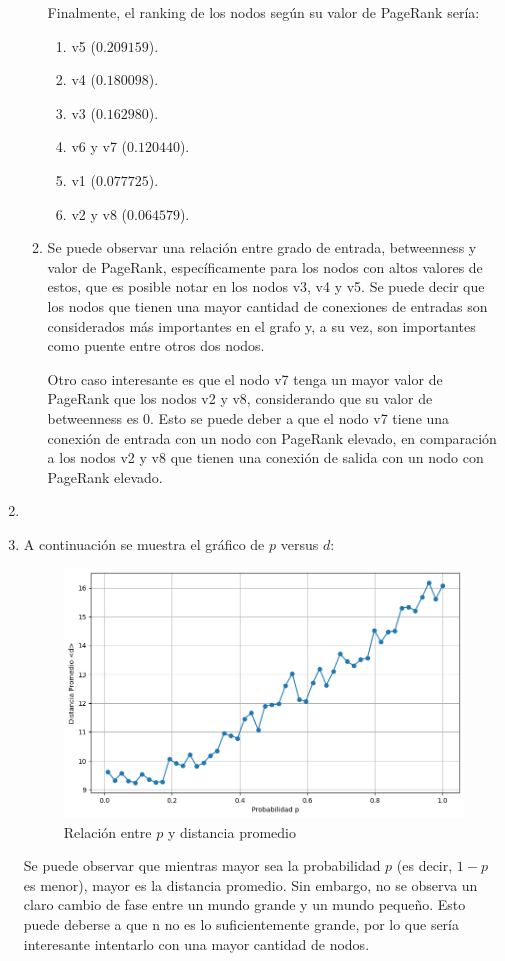 \documentclass[12pt]{article}
\begin{document}
\begin{enumerate}
\begin{enumerate}
        Finalmente, el ranking de los nodos según su valor de PageRank sería:
        \begin{enumerate}
            \item v5 ($0.209159$).
            \item v4 ($0.180098$).
            \item v3 ($0.162980$).
            \item v6 y v7 ($0.120440$).
            \item v1 ($0.077725$).
            \item v2 y v8 ($0.064579$).
        \end{enumerate}

        \item Se puede observar una relación entre grado de entrada, betweenness y valor de PageRank, específicamente para los nodos con altos valores de estos, que es posible notar en los nodos v3, v4 y v5. Se puede decir que los nodos que tienen una mayor cantidad de conexiones de entradas son considerados más importantes en el grafo y, a su vez, son importantes como puente entre otros dos nodos.

        Otro caso interesante es que el nodo v7 tenga un mayor valor de PageRank que los nodos v2 y v8, considerando que su valor de betweenness es 0. Esto se puede deber a que el nodo v7 tiene una conexión de entrada con un nodo con PageRank elevado, en comparación a los nodos v2 y v8 que tienen una conexión de salida con un nodo con PageRank elevado.

    \end{enumerate}
    \item 
    \item A continuación se muestra el gráfico de $p$ versus $d$:
    \begin{figure}[H]
        \centering
        \includegraphics[scale=0.5]{images/grafico_p8.png}
        \caption{Relación entre $p$ y distancia promedio}
        \label{fig:graph_p}
    \end{figure}
    Se puede observar que mientras mayor sea la probabilidad $p$ (es decir, $1-p$ es menor), mayor es la distancia promedio. Sin embargo, no se observa un claro cambio de fase entre un mundo grande y un mundo pequeño. Esto puede deberse a que n no es lo suficientemente grande, por lo que sería interesante intentarlo con una mayor cantidad de nodos.
\end{enumerate}
\end{document}
